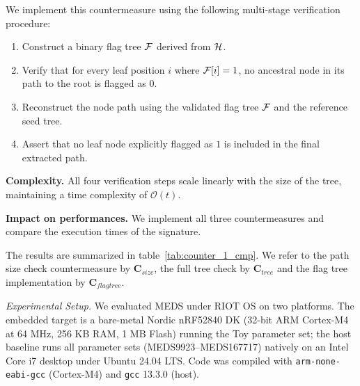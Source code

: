 We implement this countermeasure using the following multi-stage verification procedure:

\begin{enumerate}
\item Construct a binary flag tree $\mathcal{F}$ derived from $\mathcal{H}$.
\item Verify that for every leaf position $i$ where $\mathcal{F}[i] = 1$, no ancestral node in its path to the root is flagged as $0$.
\item Reconstruct the node path using the validated flag tree $\mathcal{F}$ and the reference seed tree.
\item Assert that no leaf node explicitly flagged as $1$ is included in the final extracted path.
\end{enumerate}

\noindent\textbf{Complexity. }  All four verification steps scale linearly with the size of the tree, maintaining a time complexity of $\mathcal{O}(t)$.


\noindent\textbf{Impact on performances.}
We implement all three countermeasures and compare the execution times of the signature. 

The results are summarized in table~\ref{tab:counter_1_cmp}. We refer to the path size check countermeasure by $\textbf{C}_{size}$,  
the full tree check by $\textbf{C}_{tree}$ and the flag tree implementation by $\textbf{C}_{flag tree}$.

\noindent\textit{Experimental Setup.} We evaluated MEDS under RIOT OS on two
platforms. The embedded target is a bare-metal Nordic nRF52840 DK (32-bit ARM
Cortex-M4 at 64 MHz, 256 KB RAM, 1 MB Flash) running the Toy parameter set; the
host baseline runs all parameter sets (MEDS9923--MEDS167717) natively on an
Intel Core i7 desktop under Ubuntu 24.04 LTS. Code was compiled with
\texttt{arm-none-eabi-gcc} (Cortex-M4) and \texttt{gcc} 13.3.0 (host).


